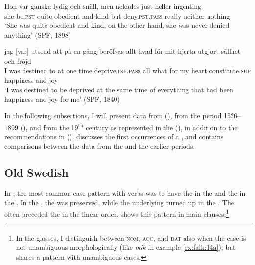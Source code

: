 \documentclass[output=paper]{langscibook}
\begin{document}
\ea%
    \label{ex:falk:13}
\ea \label{ex:falk:13a}
\gll Hon  var      ganska  lydig      och  snäll,  men  nekades      just    heller ingenting\\
 she  be\textsc{.pst}  quite    obedient  and  kind  but  deny.\textsc{pst.pass}  really    neither        nothing\\
\glt ‘She was quite obedient and kind, on the other hand, she was never denied anything’ (SPF, 1898)

\ex \label{ex:falk:13b}
\gll jag [var]   utsedd  att  på  en    gång  beröfvas            allt  hvad  för   mit  hjerta utgjort         sällhet    och  fröjd\\
I    was  destined  to  at  one  time  deprive\textsc{.inf.pass}  all    what  for   my  heart    constitute.\textsc{sup}    happiness  and  joy\\
\glt ‘I was destined to be deprived at the same time of everything that had been happiness and joy for me’ (SPF, 1840)
\z
\z


In the following subsections, I will present data from  (), from the period 1526–1899 (), and from the 19\textsuperscript{th} century as represented in the  (), in addition to the recommendations in  ().  discusses the first occurrences of a , and  contains comparisons between the data from the  and the earlier periods.

\subsection{Old Swedish}\label{sec:falk:3.3}


In , the most common case pattern with  verbs was to have the  in the  and the  in the . In the , the  was preserved, while the underlying  turned up in the . The  often preceded the  in the linear order.  shows this pattern in main clauses:\footnote{In the glosses, I distinguish between \textsc{nom,} \textsc{acc,} and \textsc{dat} also when the case is not unambiguous morphologically (like \textit{mik} in example \ref{ex:falk:14a}), but shares a pattern with unambiguous cases.}
\end{document}
